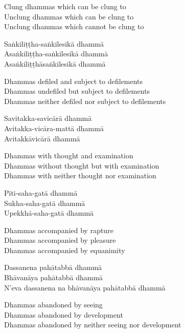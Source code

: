 \begin{english}
  Clung dhammas which can be clung to\\
  Unclung dhammas which can be clung to\\
  Unclung dhammas which cannot be clung to
\end{english}

Saṅkiliṭṭha-saṅkilesikā dhammā\\
Asaṅkiliṭṭha-saṅkilesikā dhammā\\
Asaṅkiliṭṭhāsaṅkilesikā dhammā

\begin{english}
  Dhammas defiled and subject to defilements\\
  Dhammas undefiled but subject to defilements\\
  Dhammas neither defiled nor subject to defilements
\end{english}

Savitakka-savicārā dhammā\\
Avitakka-vicāra-mattā dhammā\\
Avitakkāvicārā dhammā

\begin{english}
  Dhammas with thought and examination\\
  Dhammas without thought but with examination\\
  Dhammas with neither thought nor examination
\end{english}

Pīti-saha-gatā dhammā\\
Sukha-saha-gatā dhammā\\
Upekkhā-saha-gatā dhammā

\begin{english}
  Dhammas accompanied by rapture\\
  Dhammas accompanied by pleasure\\
  Dhammas accompanied by equanimity
\end{english}

Dassanena pahātabbā dhammā\\
Bhāvanāya pahātabbā dhammā\\
N’eva dassanena na bhāvanāya pahātabbā dhammā

\begin{english}
  Dhammas abandoned by seeing\\
  Dhammas abandoned by development\\
  Dhammas abandoned by neither seeing nor development
\end{english}

